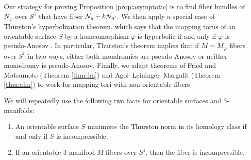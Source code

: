 Our strategy for proving Proposition \ref{prop:asymptotic} is to find fiber bundles of $N_{\varphi}$ over $S^1$ that have fiber $\mathcal{N}_g+k\mathcal{N}_{g'}$.  We then apply a special case of Thurston's hyperbolization theorem, which says that the mapping torus of an orientable surface $S$ by a homeomorphism $\varphi$ is hyperbolic if and only if $\varphi$ is pseudo-Anosov \cite[Theorem 0.1]{thurston_hyp}.  In particular, Thurston's theorem implies that if $M=M_\varphi$ fibers over $S^1$ in two ways, either both mondromies are pseudo-Anosov or neither monodromy is pseudo-Anosov.  Finally, we adapt theorems of Fried and Matsumoto (Theorem \ref{thm:fm}) and Agol--Leininger--Margalit (Theorem \ref{thm:alm}) to work for mapping tori with non-orientable fibers.


\medskip
We will repeatedly use the following two facts for orientable surfaces and 3-manifolds:
\begin{enumerate}
 \item An orientable surface $S$ minimizes the Thurston norm in its homology class if and only if $S$ is incompressible.
\item  If an orientable 3-manifold $M$ fibers over $S^1$, then the fiber is incompressible.
\end{enumerate}





